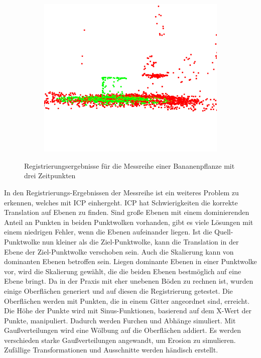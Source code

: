\documentclass[12pt,titlepage, twoside]{article}
\begin{document}
\begin{figure}[htb]
\begin{subfigure}{0.3\textwidth}
  \includegraphics[width=\linewidth]{./Images/RegistrationBananaT3.png}
  \label{fig:registration:banana:3}
\end{subfigure}
\caption{Registrierungsergebnisse für die Messreihe einer Bananenpflanze mit drei Zeitpunkten}
\label{fig:registration:banana}
\end{figure}

In den Registrierungs-Ergebnissen der Messreihe ist ein weiteres Problem zu erkennen, welches mit ICP einhergeht. 
ICP hat Schwierigkeiten die korrekte Translation auf Ebenen zu finden. Sind große Ebenen mit einem dominierenden Anteil an Punkten in beiden Punktwolken vorhanden, 
 gibt es viele Lösungen mit einem niedrigen Fehler, wenn die Ebenen aufeinander liegen. Ist die Quell-Punktwolke nun kleiner als die Ziel-Punktwolke, kann die Translation in der Ebene der Ziel-Punktwolke verschoben sein.
Auch die Skalierung kann von dominanten Ebenen betroffen sein. Liegen dominante Ebenen in einer Punktwolke vor, wird die Skalierung gewählt, die die beiden Ebenen bestmöglich auf eine Ebene bringt.
Da in der Praxis mit eher unebenen Böden zu rechnen ist, wurden einige Oberflächen generiert und auf diesen die Registrierung getestet. 
Die Oberflächen werden mit Punkten, die in einem Gitter angeordnet sind, erreicht. Die Höhe der Punkte wird mit Sinus-Funktionen, basierend auf dem X-Wert der Punkte, manipuliert. Dadurch werden Furchen und Abhänge simuliert. 
Mit Gaußverteilungen wird eine Wölbung auf die Oberflächen addiert. Es werden verschieden starke Gaußverteilungen angewandt, um Erosion zu simulieren.
Zufällige Transformationen und Ausschnitte werden händisch erstellt.
\end{document}

